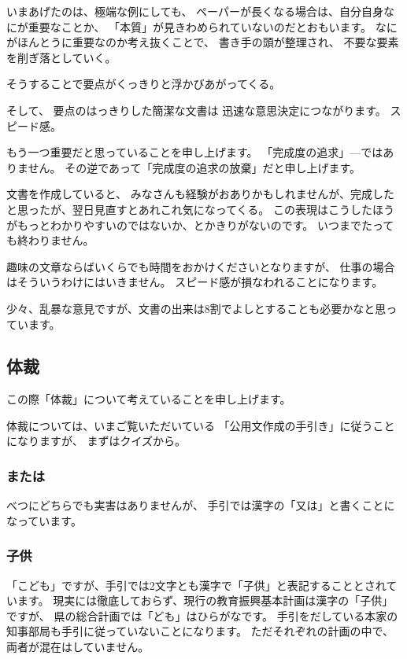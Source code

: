 \documentclass[uplatex,jis2004,dvipdfmx,12pt]{jsarticle}
\begin{document}
いまあげたのは、極端な例にしても、
ペーパーが長くなる場合は、自分自身なにが重要なことか、
「本質」が見きわめられていないのだとおもいます。
なにがほんとうに重要なのか考え抜くことで、
書き手の頭が整理され、
不要な要素を削ぎ落としていく。

そうすることで要点がくっきりと浮かびあがってくる。

そして、
要点のはっきりした簡潔な文書は
迅速な意思決定につながります。
スピード感。

もう一つ重要だと思っていることを申し上げます。
「完成度の追求」---ではありません。
その逆であって「完成度の追求の放棄」だと申し上げます。

文書を作成していると、
みなさんも経験がおありかもしれませんが、完成したと思ったが、翌日見直すとあれこれ気になってくる。
この表現はこうしたほうがもっとわかりやすいのではないか、とかきりがないのです。
いつまでたっても終わりません。

趣味の文章ならばいくらでも時間をおかけくださいとなりますが、
仕事の場合はそういうわけにはいきません。
スピード感が損なわれることになります。

少々、乱暴な意見ですが、文書の出来は8割でよしとすることも必要かなと思っています。







\subsection{体裁}

この際「体裁」について考えていることを申し上げます。


体裁については、いまご覧いただいている
「公用文作成の手引き」に従うことになりますが、
まずはクイズから。

\subsubsection{または}
べつにどちらでも実害はありませんが、
手引では漢字の「又は」と書くことになっています。


\subsubsection{子供}
「こども」ですが、手引では2文字とも漢字で「子供」と表記することとされています。
現実には徹底しておらず、現行の教育振興基本計画は漢字の「子供」ですが、
県の総合計画では「ども」はひらがなです。
手引をだしている本家の知事部局も手引に従っていないことになります。
ただそれぞれの計画の中で、
両者が混在はしていません。
\end{document}

